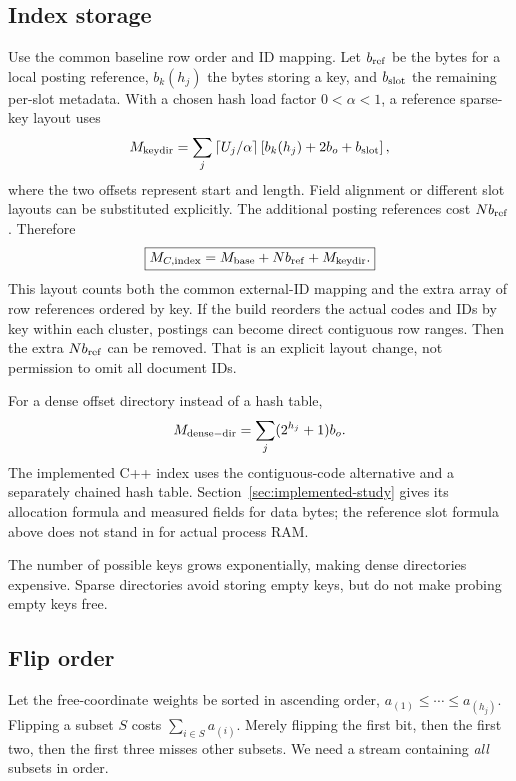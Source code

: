 \subsection{Index storage}
Use the common baseline row order and ID mapping. Let $b_{\rm ref}$ be the bytes for a local
posting reference, $b_k(h_j)$ the bytes storing a key, and $b_{\rm slot}$ the remaining per-slot
metadata. With a chosen hash load factor $0<\alpha<1$, a reference sparse-key layout uses
\begin{equation}
M_{\rm keydir}=\sum_j\left\lceil U_j/\alpha\right\rceil
                 \left[b_k(h_j)+2b_o+b_{\rm slot}\right],
\label{eq:hash-storage}
\end{equation}
where the two offsets represent start and length. Field alignment or different slot layouts
can be substituted explicitly. The additional posting references cost $N b_{\rm ref}$.
Therefore
\begin{equation}
\boxed{M_{C,\rm index}=M_{\mathrm{base}}+N b_{\rm ref}+M_{\rm keydir}.}
\label{eq:keys-storage}
\end{equation}
This layout counts both the common external-ID mapping and the extra
array of row references ordered by key. If the build reorders the actual codes and IDs by key within each
cluster, postings can become direct contiguous row ranges. Then the extra $N b_{\rm ref}$ can
be removed. That is an explicit layout change, not permission to omit all document IDs.

For a dense offset directory instead of a hash table,
\[
M_{\rm dense-dir}=\sum_j(2^{h_j}+1)b_o.
\]
The implemented C++ index uses the contiguous-code alternative and a separately chained
hash table. Section~\ref{sec:implemented-study} gives its allocation formula and measured
fields for data bytes; the reference slot formula above does not stand in for actual process RAM.

The number of possible keys grows exponentially, making dense directories expensive. Sparse directories avoid storing
empty keys, but do not make probing empty keys free.

\subsection{Flip order}
Let the free-coordinate weights be sorted in ascending order,
$a_{(1)}\leq\cdots\leq a_{(h_j)}$. Flipping a subset $S$ costs
$\sum_{i\in S}a_{(i)}$. Merely flipping the first bit, then the first two, then the first three
misses other subsets. We need a stream containing \emph{all} subsets in order.

